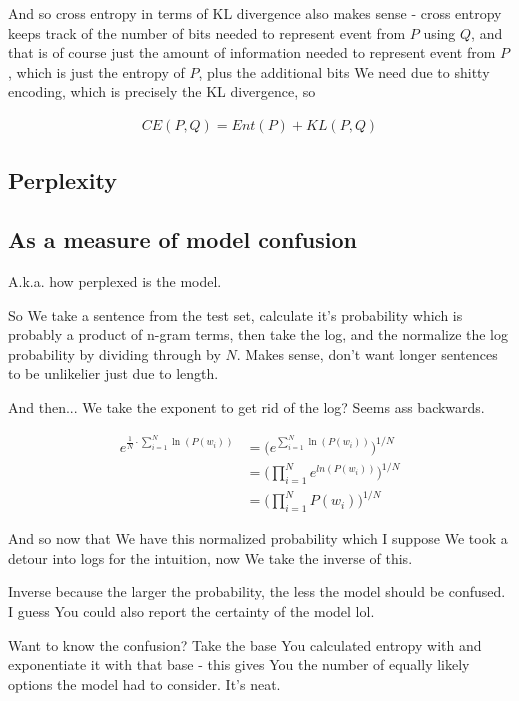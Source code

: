 \documentclass{article}
\begin{document}
		And so cross entropy in terms of KL divergence also makes sense - cross entropy keeps track of the number of bits needed to represent event from $P$ using $Q$, and that is of course just the amount of information needed to represent event from $P$, which is just the entropy of $P$, plus the additional bits We need due to shitty encoding, which is precisely the KL divergence, so
		
		\begin{align}
			CE(P, Q) = Ent(P) + KL(P, Q)
		\end{align}
		
	\subsection{Perplexity}
	
		\subsection{As a measure of model confusion}
		
			A.k.a. how perplexed is the model.
			
			So We take a sentence from the test set, calculate it's probability which is probably a product of n-gram terms, then take the log, and the normalize the log probability by dividing through by $N$. Makes sense, don't want longer sentences to be unlikelier just due to length.
			
			And then... We take the exponent to get rid of the log? Seems ass backwards.
			
			\begin{align}
				e^{\frac{1}{N}\cdot\sum^N_{i=1}\ln(P(w_i))} &= \big(e^{\sum^N_{i=1}\ln(P(w_i))}\big)^{1/N}\\
				&= \bigg(\prod^N_{i=1} e^{ln(P(w_i))}\bigg)^{1/N}\\
				&= \bigg(\prod^N_{i=1} P(w_i)\bigg)^{1/N}
			\end{align}
			
			And so now that We have this normalized probability which I suppose We took a detour into logs for the intuition, now We take the inverse of this.
			
			Inverse because the larger the probability, the less the model should be confused. I guess You could also report the certainty of the model lol.
			
			Want to know the confusion? Take the base You calculated entropy with and exponentiate it with that base - this gives You the number of equally likely options the model had to consider. It's neat.
			
\end{document}
